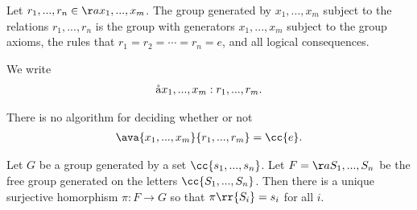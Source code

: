 \documentclass{article}
\begin{document}
\begin{definition}
	Let $r_1,...,r_n\in\aa{x_1,...,x_m}$. The group generated by $x_1,...,x_m$ subject
	to the relations $r_1,...,r_n$ is the group with generators $x_1,...,x_m$ subject to the
	group axioms, the rules that $r_1=r_2=\cdots=r_n=e$, and all logical consequences.

	We write
	\begin{align*}
		\aa{x_1,...,x_m : r_1,...,r_m}.
	\end{align*}
\end{definition}

\begin{theorem}[Novikov]
	There is no algorithm for deciding whether or not
	\begin{align*}
		\ava{x_1,...,x_m}{r_1,...,r_m}=\cc{e}.
	\end{align*}
\end{theorem}

\begin{proposition}
	Let $G$ be a group generated by a set $\cc{s_1,...,s_n}$. Let $F=\aa{S_1,...,S_n}$
	be the free group generated on the letters $\cc{S_1,...,S_n}$. Then there is a unique
	surjective homorphism $\pi:F\to G$ so that $\pi\rr{S_i}=s_i$ for all $i$.
\end{proposition}
\end{document}
